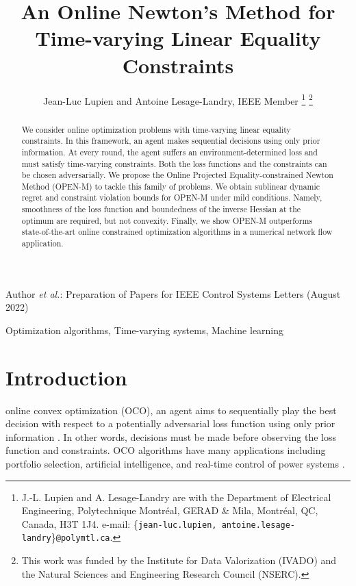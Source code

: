 \documentclass[journal,twoside,web]{ieeecolor}
\begin{document}
\def\BibTeX{{\rm B\kern-.05em{\sc i\kern-.025em b}\kern-.08em
    T\kern-.1667em\lower.7ex\hbox{E}\kern-.125emX}}
{Author \MakeLowercase{\textit{et al.}}: Preparation of Papers for IEEE Control Systems Letters (August 2022)}


\title{An Online Newton's Method for Time-varying Linear Equality Constraints}

\author{Jean-Luc Lupien and
Antoine Lesage-Landry, IEEE Member
\thanks{J.-L. Lupien and A. Lesage-Landry are with the Department of Electrical Engineering, Polytechnique Montréal, GERAD \& Mila, Montréal, QC, Canada, H3T 1J4. e-mail: \{\texttt{jean-luc.lupien, antoine.lesage-landry}\}\texttt{@polymtl.ca}.}%
\thanks{This work was funded by the Institute for Data Valorization (IVADO) and the Natural Sciences and Engineering Research Council (NSERC).}%
}




\maketitle
\thispagestyle{empty}
 

\begin{abstract}
We consider online optimization problems with time-varying linear equality constraints. In this framework, an agent makes sequential decisions using only prior information. At every round, the agent suffers an environment-determined loss and must satisfy time-varying constraints. Both the loss functions and the constraints can be chosen adversarially. We propose the Online Projected Equality-constrained Newton Method (OPEN-M) to tackle this family of problems. We obtain sublinear dynamic regret and constraint violation bounds for OPEN-M under mild conditions. Namely, smoothness of the loss function and boundedness of the inverse Hessian at the optimum are required, but not convexity. Finally, we show OPEN-M outperforms state-of-the-art online constrained optimization algorithms in a numerical network flow application.\end{abstract}

\begin{IEEEkeywords}
Optimization algorithms, Time-varying systems, Machine learning
\end{IEEEkeywords}

\section{Introduction}
 online convex optimization (OCO), an agent aims to sequentially play the best decision with respect to a potentially adversarial loss function using only prior information \cite{Shalev,zinkevich2003online}. {In other words, decisions must be made before observing the loss function and constraints.} OCO algorithms have many applications including portfolio selection, artificial intelligence, and real-time control of power systems \cite{taylor2016power,hazanOCO,applications}. 
\end{document}
